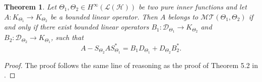 \documentclass[11pt]{amsart}
\numberwithin{equation}{section}
\newcommand{\hsp}{\mathcal{H}}
\newcommand{\oL }{\mathcal{L}(\hsp) }
\newcommand{\dfc}[1]{D_{\Theta_#1}}
\newtheorem{theorem}{Theorem}[section]
\theoremstyle{definition}
\numberwithin{equation}{section}
\begin{document}
\begin{theorem}\label{tcara}
	Let $ {\Theta_1},{\Theta_2} \in H^{\infty}(\oL)$ be two pure inner functions and let $A:K_{\Theta_{1}}\rightarrow  K_{\Theta_{2}}$ be a bounded linear operator. Then $A$ belongs to $\mathcal{MT}(\Theta_{1}, \Theta_{2})$  if and only if there exist bounded linear operators \mbox{$B_1:\mathcal{D}_{\Theta_{1}}\to K_{\Theta_{2}}$} and $B_2: \mathcal{D}_{\Theta_{2}}\to K_{\Theta_{1}}$, such that
	\begin{equation}\label{cara}
	A-S_{\Theta_2}AS_{\Theta_1}^*=B_1\dfc{1}+\dfc{2}B_2^*.
	\end{equation}
\end{theorem}
\begin{proof} The proof follows the same line of reasoning as the proof of Theorem 5.2 in \cite{KT}.
\end{proof}
%
%	
\end{document}
